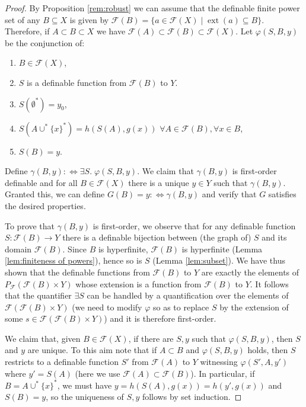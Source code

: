 \documentclass{amsart}
\newcommand{\ca}{\mathcal}
\theoremstyle{plain}
\theoremstyle{definition}
\newcommand{\F}{\mathcal{F}}
\newcommand{\pF}{P_{\ca F}}
\newcommand{\ext}[1]{\operatorname{ext}(#1)}
\begin{document}
\begin{proof} By Proposition \ref{rem:robust} we can assume that the definable finite power set of any $B \subseteq X$ is given by $\F(B) = \{a \in \F(X) \mid \ext a \subseteq B\}$. Therefore, if $A\subset B \subset X$ we have $\F(A) \subset \F(B) \subset \F(X)$. 
Let $\varphi(S,B,y)$ be the conjunction of:  
\begin{enumerate}
\item $B\in \F(X)$, 
\item $S$ is a definable function from $\F(B)$ to $Y$. 
\item $S(\emptyset^*) = y_0$,
\item $S(A \cup^* \{x\}^*) = h(S(A), g(x))$ \hspace{1em} $\forall A \in \F(B), \forall x \in B$,
\item $S(B) = y$. 
\end{enumerate}
Define $\gamma(B,y) :\iff \exists S. \; \varphi(S, B,y)$. We claim that $\gamma(B,y)$ is first-order definable and for all $B\in \F(X)$ there is a unique $y\in Y$ such that $\gamma(B,y)$. Granted this, we can define  $G(B) = y :\iff \gamma(B,y)$ and verify that $G$ satisfies the desired properties. 

To prove that $\gamma(B, y)$ is first-order, we observe that for any definable function $S:\F(B)\to Y$ there is a definable bijection between (the graph of) $S$ and its domain $\F(B)$. Since $B$ is hyperfinite, $\F(B)$ is hyperfinite (Lemma \ref{lem:finiteness of powers}), hence so is $S$ (Lemma \ref{lem:subset}). We have thus shown that the definable functions from $\F(B)$ to $Y$ are exactly the elements of $\pF(\F(B)\times Y)$ whose extension is a function from $\F(B)$ to $Y$. It follows that the quantifier $\exists S$ can be handled by a quantification over the elements of $\F(\F(B)\times Y)$ (we need to modify $\varphi$ so as to replace $S$ by the extension of some $s\in \F(\F(B)\times Y)$) and it is therefore first-order. 

We claim that, given $B\in \F(X)$, if there are $S,y$ such that $\varphi(S,B,y)$, then $S$ and $y$ are unique.  To this aim note that if $A\subset B$ and $\varphi(S,B,y)$ holds, then $S$ restricts to a definable function $S'$ from $\F(A)$ to $Y$ witnessing $\varphi(S',A,y')$ where $y' = S(A)$ (here we use $\F(A) \subset \F(B)$). In particular, if $B = A \cup^* \{x\}^*$, we must have $y = h(S(A), g(x)) = h(y', g(x))$ and $S(B)=y$, so the uniqueness of $S,y$ follows by set induction. 
 

\end{proof}
\end{document}
